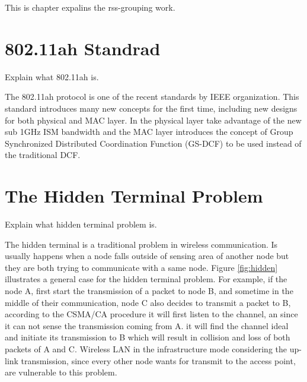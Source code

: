 \label{chapter:single}

This is chapter expalins the rss-grouping work.
\section{802.11ah Standrad}
 Explain what 802.11ah is.

 The 802.11ah protocol is one of the recent standards by IEEE organization. This standard introduces many new concepts for the first time, including new designs for both physical and MAC layer. In the physical layer take advantage of the new sub 1GHz ISM bandwidth and the MAC layer introduces the concept of Group Synchronized Distributed Coordination Function (GS-DCF) to be used instead of the traditional DCF.   
\section{The Hidden Terminal Problem}

Explain what hidden terminal problem is.

The hidden terminal is a traditional problem in wireless communication. Is usually happens when a node falls outside of sensing area of another node but they are both trying to communicate with a same node. Figure \ref{fig:hidden} illustrates a general case for the hidden terminal problem. For example, if the node A, first start the transmission of a packet to node B, and sometime in the middle of their communication, node C also decides to transmit a packet to B, according to the CSMA/CA procedure it will first listen to the channel, an since it can not sense the transmission coming from A. it will find the channel ideal and initiate its transmission to B which will result in collision and loss of both packets of A and C. Wireless LAN in the infrastructure mode considering the up-link transmission, since every other node wants for transmit to the access point, are vulnerable to this problem. 


